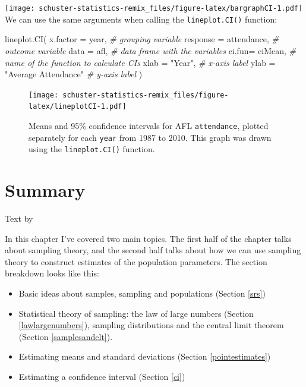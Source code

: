 \documentclass[
]{book}
\newenvironment{Shaded}{\begin{snugshade}}{\end{snugshade}}
\newcommand{\AttributeTok}[1]{\textcolor[rgb]{0.77,0.63,0.00}{#1}}
\newcommand{\CommentTok}[1]{\textcolor[rgb]{0.56,0.35,0.01}{\textit{#1}}}
\newcommand{\FunctionTok}[1]{\textcolor[rgb]{0.00,0.00,0.00}{#1}}
\newcommand{\NormalTok}[1]{#1}
\newcommand{\StringTok}[1]{\textcolor[rgb]{0.31,0.60,0.02}{#1}}
\providecommand{\tightlist}{%
  \setlength{\itemsep}{0pt}\setlength{\parskip}{0pt}}
\begin{document}
\texttt{[image: schuster-statistics-remix\_files/figure-latex/bargraphCI-1.pdf]}
We can use the same arguments when calling the \texttt{lineplot.CI()} function:

\begin{Shaded}
\begin{Highlighting}[]
\FunctionTok{lineplot.CI}\NormalTok{( }\AttributeTok{x.factor =}\NormalTok{ year,            }\CommentTok{\# grouping variable }
             \AttributeTok{response =}\NormalTok{ attendance,      }\CommentTok{\# outcome variable}
             \AttributeTok{data =}\NormalTok{ afl,                 }\CommentTok{\# data frame with the variables}
             \AttributeTok{ci.fun=}\NormalTok{ ciMean,             }\CommentTok{\# name of the function to calculate CIs}
             \AttributeTok{xlab =} \StringTok{"Year"}\NormalTok{,              }\CommentTok{\# x{-}axis label}
             \AttributeTok{ylab =} \StringTok{"Average Attendance"} \CommentTok{\# y{-}axis label}
\NormalTok{)}
\end{Highlighting}
\end{Shaded}

\begin{figure}
\centering
\texttt{[image: schuster-statistics-remix\_files/figure-latex/lineplotCI-1.pdf]}
\caption{\label{fig:lineplotCI}Means and 95\% confidence intervals for AFL \texttt{attendance}, plotted separately for each \texttt{year} from 1987 to 2010. This graph was drawn using the \texttt{lineplot.CI()} function.}
\end{figure}

\hypertarget{summary-3}{%
\section{Summary}\label{summary-3}}

Text by \citet{Navarro2018}

In this chapter I've covered two main topics. The first half of the chapter talks about sampling theory, and the second half talks about how we can use sampling theory to construct estimates of the population parameters. The section breakdown looks like this:

\begin{itemize}
\tightlist
\item
  Basic ideas about samples, sampling and populations (Section \ref{srs})
\item
  Statistical theory of sampling: the law of large numbers (Section \ref{lawlargenumbers}), sampling distributions and the central limit theorem (Section \ref{samplesandclt}).
\item
  Estimating means and standard deviations (Section \ref{pointestimates})
\item
  Estimating a confidence interval (Section \ref{ci})
\end{itemize}
\end{document}

